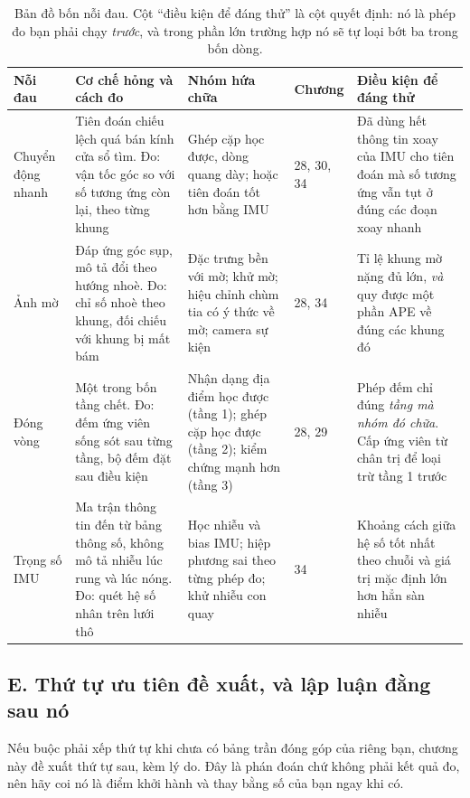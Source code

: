 \documentclass[../../deep_learning.tex]{subfiles}
\begin{document}
\begin{table}[H]\centering\footnotesize
\caption{Bản đồ bốn nỗi đau. Cột ``điều kiện để đáng thử'' là cột quyết định: nó là phép đo bạn phải chạy \emph{trước}, và trong phần lớn trường hợp nó sẽ tự loại bớt ba trong bốn dòng.}
\label{tab:f27-noi-dau}
\begin{tabularx}{\linewidth}{@{}L{1.75cm}L{3.4cm}L{3.2cm}L{1.05cm}Y@{}}
\toprule
\textbf{Nỗi đau} & \textbf{Cơ chế hỏng và cách đo} & \textbf{Nhóm hứa chữa} & \textbf{Chương} & \textbf{Điều kiện để đáng thử}\\
\midrule
Chuyển động nhanh &
Tiên đoán chiếu lệch quá bán kính cửa sổ tìm. Đo: vận tốc góc so với số tương ứng còn lại, theo từng khung &
Ghép cặp học được, dòng quang dày; hoặc tiên đoán tốt hơn bằng IMU &
28, 30, 34 &
Đã dùng hết thông tin xoay của IMU cho tiên đoán mà số tương ứng vẫn tụt ở đúng các đoạn xoay nhanh\\
Ảnh mờ &
Đáp ứng góc sụp, mô tả đổi theo hướng nhoè. Đo: chỉ số nhoè theo khung, đối chiếu với khung bị mất bám &
Đặc trưng bền với mờ; khử mờ; hiệu chỉnh chùm tia có ý thức về mờ; camera sự kiện &
28, 34 &
Tỉ lệ khung mờ nặng đủ lớn, \emph{và} quy được một phần APE về đúng các khung đó\\
Đóng vòng &
Một trong bốn tầng chết. Đo: đếm ứng viên sống sót sau từng tầng, bộ đếm đặt sau điều kiện &
Nhận dạng địa điểm học được (tầng 1); ghép cặp học được (tầng 2); kiểm chứng mạnh hơn (tầng 3) &
28, 29 &
Phép đếm chỉ đúng \emph{tầng mà nhóm đó chữa}. Cấp ứng viên từ chân trị để loại trừ tầng 1 trước\\
Trọng số IMU &
Ma trận thông tin đến từ bảng thông số, không mô tả nhiễu lúc rung và lúc nóng. Đo: quét hệ số nhân trên lưới thô &
Học nhiễu và bias IMU; hiệp phương sai theo từng phép đo; khử nhiễu con quay &
34 &
Khoảng cách giữa hệ số tốt nhất theo chuỗi và giá trị mặc định lớn hơn hẳn sàn nhiễu\\
\bottomrule
\end{tabularx}
\end{table}

\subsection{E. Thứ tự ưu tiên đề xuất, và lập luận đằng sau nó}
Nếu buộc phải xếp thứ tự khi chưa có bảng trần đóng góp của riêng bạn, chương này đề xuất thứ tự sau, kèm lý do. Đây là phán đoán chứ không phải kết quả đo, nên hãy coi nó là điểm khởi hành và thay bằng số của bạn ngay khi có.
\end{document}
